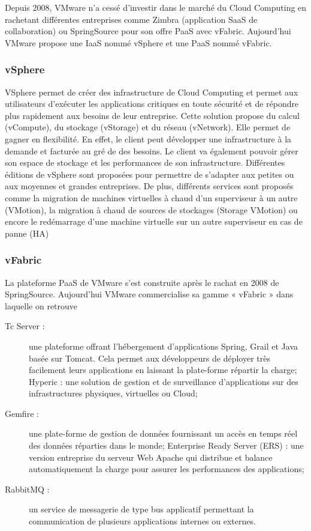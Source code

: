 \documentclass[a4paper,12pt]{report}
\begin{document}
\begin{onehalfspace}
	Depuis 2008, VMware n’a cessé d’investir dans le marché du Cloud Computing en rachetant différentes entreprises comme Zimbra (application SaaS de collaboration) ou SpringSource pour son offre PaaS avec vFabric. Aujourd’hui VMware propose une IaaS nommé vSphere et une PaaS nommé vFabric.
	\subsubsection*{vSphere}
	VSphere permet de créer des infrastructure de Cloud Computing et permet aux utilisateurs d'exécuter les applications critiques en toute sécurité et de répondre plus rapidement aux besoins de leur entreprise. Cette solution propose du calcul (vCompute), du stockage (vStorage) et du réseau (vNetwork). Elle permet de gagner en flexibilité. En effet, le client peut développer une infrastructure à la demande et facturée au gré de des besoins. Le client va également pouvoir gérer son espace de stockage et les performances de son infrastructure. Différentes éditions de vSphere sont proposées pour permettre de s’adapter aux petites ou aux moyennes et grandes entreprises. De plus, différents services sont proposés comme la migration de machines virtuelles à chaud d’un superviseur à un autre (VMotion), la migration à chaud de sources de stockages (Storage VMotion) ou encore le redémarrage d’une machine virtuelle sur un autre superviseur en cas de panne (HA) %

	\subsubsection*{vFabric}
	La plateforme PaaS de VMware s'est construite après le rachat en 2008 de SpringSource. Aujourd'hui VMware commercialise sa gamme « vFabric » dans laquelle on retrouve %
	\begin{description}
		\item[Tc Server :] une plateforme offrant l'hébergement d'applications Spring, Grail et Java basée sur Tomcat. Cela permet aux développeurs de déployer très facilement leurs applications en laissant la plate-forme répartir la charge; Hyperic : une solution de gestion et de surveillance d'applications sur des infrastructures physiques, virtuelles ou Cloud;
		\item[Gemfire :] une plate-forme de gestion de données fournissant un accès en temps réel des données réparties dans le monde; Enterprise Ready Server (ERS) : une version entreprise du serveur Web Apache qui distribue et balance automatiquement la charge pour assurer les performances des applications;
		\item[RabbitMQ :] un service de messagerie de type bus applicatif permettant la communication de plusieurs applications internes ou externes.
	\end{description}



\end{onehalfspace}
\end{document}
